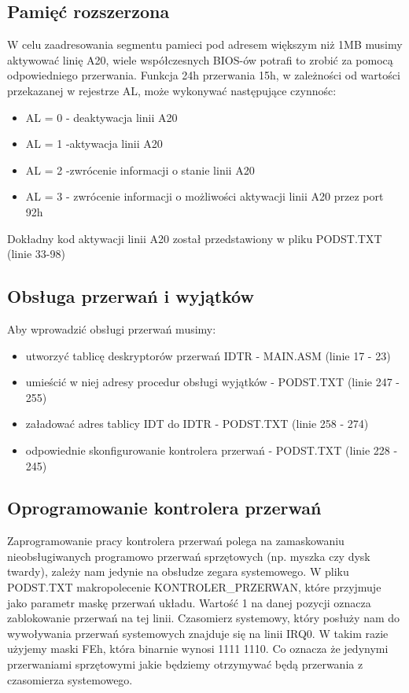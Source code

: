 \documentclass[a4paper,12pt]{article}
\begin{document}
\subsection{Pamięć rozszerzona}
W celu zaadresowania segmentu pamieci pod adresem większym niż 1MB musimy aktywować linię A20, wiele współczesnych BIOS-ów potrafi to zrobić za pomocą odpowiedniego przerwania. Funkcja 24h przerwania 15h, w zależności od wartości przekazanej w rejestrze AL, może wykonywać następujące czynnośc: 
\begin{itemize}
\item{AL = 0 - deaktywacja linii A20}
\item{AL = 1 -aktywacja linii A20}
\item{AL = 2 -zwrócenie informacji o stanie linii A20}
\item{AL = 3 - zwrócenie informacji o możliwości aktywacji linii A20 przez port 92h}
\end{itemize}

Dokładny kod aktywacji linii A20 został przedstawiony w pliku PODST.TXT (linie 33-98)


\subsection{Obsługa przerwań i wyjątków}
Aby wprowadzić obsługi przerwań musimy:
\begin{itemize}
\item{utworzyć tablicę deskryptorów przerwań IDTR - MAIN.ASM (linie 17 - 23)}
\item{umieścić w niej adresy procedur obsługi wyjątków - PODST.TXT (linie 247 - 255) }
\item{załadować adres tablicy IDT do IDTR - PODST.TXT (linie 258 - 274)}
\item{odpowiednie skonfigurowanie kontrolera przerwań - PODST.TXT (linie 228 - 245)}
\end{itemize}

		\subsection{Oprogramowanie kontrolera przerwań}
Zaprogramowanie pracy kontrolera przerwań polega na zamaskowaniu nieobsługiwanych programowo przerwań sprzętowych (np. myszka czy dysk twardy), zależy nam jedynie na obsłudze zegara systemowego. W pliku PODST.TXT makropolecenie KONTROLER\_PRZERWAN, które przyjmuje jako parametr maskę przerwań układu. Wartość 1 na danej pozycji oznacza zablokowanie przerwań na tej linii. Czasomierz systemowy, który posłuży nam do wywoływania przerwań systemowych znajduje się na linii IRQ0. W takim razie użyjemy maski FEh, która binarnie wynosi 1111 1110. Co oznacza że jedynymi przerwaniami sprzętowymi jakie będziemy otrzymywać będą przerwania z czasomierza systemowego.
\end{document}
